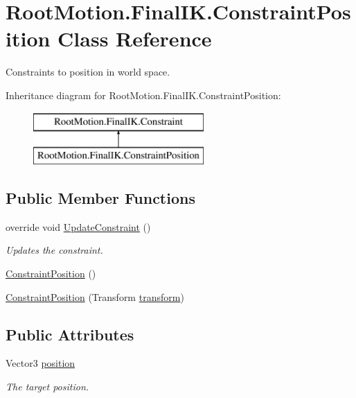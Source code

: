 \hypertarget{class_root_motion_1_1_final_i_k_1_1_constraint_position}{}\section{Root\+Motion.\+Final\+I\+K.\+Constraint\+Position Class Reference}
\label{class_root_motion_1_1_final_i_k_1_1_constraint_position}


Constraints to position in world space.  


Inheritance diagram for Root\+Motion.\+Final\+I\+K.\+Constraint\+Position\+:\begin{figure}[H]
\begin{center}
\leavevmode
\includegraphics[height=2.000000cm]{class_root_motion_1_1_final_i_k_1_1_constraint_position}
\end{center}
\end{figure}
\subsection*{Public Member Functions}
\begin{DoxyCompactItemize}
\item 
override void \mbox{\hyperlink{class_root_motion_1_1_final_i_k_1_1_constraint_position_a872cfb0d7c9de48b4848fcc931e838c1}{Update\+Constraint}} ()
\begin{DoxyCompactList}\small\item\em Updates the constraint. \end{DoxyCompactList}\item 
\mbox{\hyperlink{class_root_motion_1_1_final_i_k_1_1_constraint_position_a6f544f8a0f8612037f477599ac183e6b}{Constraint\+Position}} ()
\item 
\mbox{\hyperlink{class_root_motion_1_1_final_i_k_1_1_constraint_position_a8b21daf24a56d4a3b49bd88b33a9a6d9}{Constraint\+Position}} (Transform \mbox{\hyperlink{class_root_motion_1_1_final_i_k_1_1_constraint_a2fe5a6e41ac6da0e5cb97a231696f937}{transform}})
\end{DoxyCompactItemize}
\subsection*{Public Attributes}
\begin{DoxyCompactItemize}
\item 
Vector3 \mbox{\hyperlink{class_root_motion_1_1_final_i_k_1_1_constraint_position_a151c5322ba3a4de83eb5cfe334db93f0}{position}}
\begin{DoxyCompactList}\small\item\em The target position. \end{DoxyCompactList}\end{DoxyCompactItemize}

